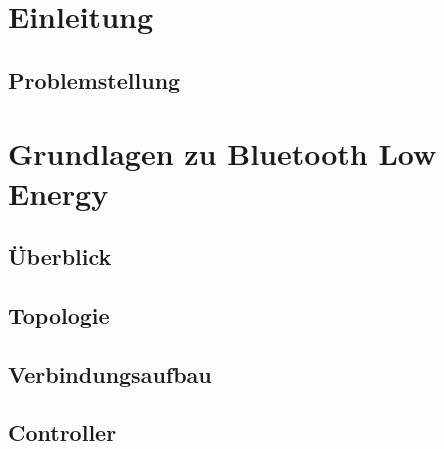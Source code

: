 \documentclass[doktyp=barbeit]{TUBAFarbeiten}
\begin{document}
\maketitle

\TUBAFErklaerungsseite



\tableofcontents
\newpage
\listoffigures
\listoftables

\newpage
\section{Einleitung}
	\label{sec: einleitung}
	

	\subsection{Problemstellung}
		\label{sec: problemstellung}
		

\newpage
\section{Grundlagen zu Bluetooth Low Energy}
\label{sec: grundlagen le}

	\subsection{Überblick}
		\label{sec: le ueberblick}
		

	\subsection{Topologie}
		\label{sec: le topologie}
		

	\subsection{Verbindungsaufbau}
		\label{sec: le verbindungsaufbau}
		

	\subsection{Controller}
		\label{sec: le controller}
		
\end{document}
